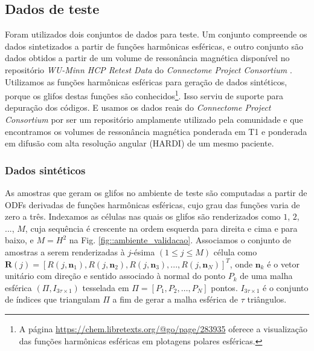 
\subsection{Dados de teste}
\label{ssec::dados_de_teste}

Foram utilizados dois conjuntos de dados para teste. Um conjunto compreende os dados sintetizados a partir de funções harmônicas esféricas, e outro conjunto são dados obtidos a partir de um volume de ressonância magnética disponível no repositório \textit{WU-Minn HCP Retest Data} do \textit{Connectome Project Consortium} \cite{essen2012}. Utilizamos as funções harmônicas esféricas para geração de dados sintéticos, porque os glifos destas funções são conhecidos\footnote{A página \url{https://chem.libretexts.org/@go/page/283935} oferece a visualização das funções harmônicas esféricas em plotagens polares esféricas.}. Isso serviu de suporte para depuração dos códigos.  E usamos os dados reais do \textit{Connectome Project Consortium} por ser um repositório amplamente utilizado pela comunidade e que encontramos os volumes de ressonância magnética ponderada em T1 e ponderada em difusão com alta resolução angular (HARDI) de um mesmo paciente.


\subsubsection{Dados sintéticos}
\label{sssec::dados_sinteticos}

 As amostras que geram os glifos no ambiente de teste são computadas a partir de ODFs derivadas de funções harmônicas esféricas, cujo grau das funções varia de zero a três. 
Indexamos as células nas quais os glifos são renderizados como $1$, $2$, ..., $M$, cuja sequência é crescente na ordem esquerda para direita e cima e para baixo, e $M = H^2$ na Fig. \ref{fig::ambiente_validacao}. Associamos o conjunto de amostras a serem renderizadas à $j$-ésima $(1 \leq j \leq M)$ célula como $\boldsymbol{R}(j) = [
R(j, \mathbf{n}_1), 
R(j, \mathbf{n}_2), 
R(j, \mathbf{n}_3), ..., 
R(j, \mathbf{n}_N)
]^T$, onde $\mathbf{n}_k$ é o vetor unitário com direção e sentido associado à normal do ponto $P_k$ de uma malha esférica $(\Pi, I_{3\tau \times 1})$ tesselada em $\Pi = [P_1, P_2, \dots, P_N]$ pontos. $I_{3\tau \times 1}$ é o conjunto de índices que triangulam $\Pi$ a fim de gerar a malha esférica de $\tau$ triângulos.%

